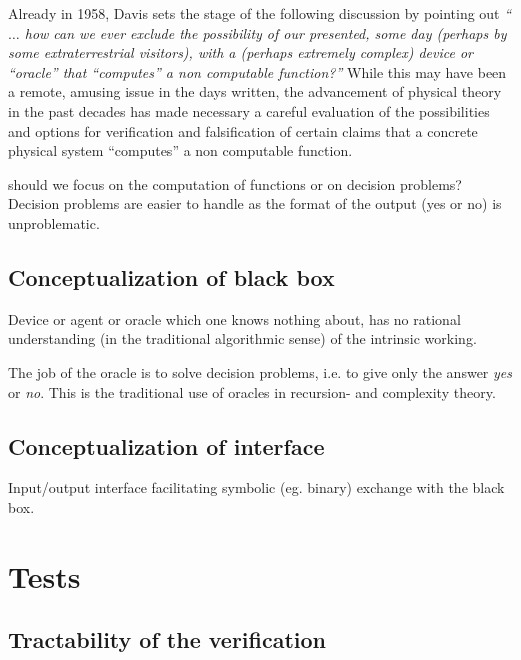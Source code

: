 Already in 1958, Davis \cite[p. 11]{davis-58}
sets the stage of the following discussion by pointing out
 {\em `` $\ldots$ how can we ever exclude the possibility of our
 presented,
 some day (perhaps by some extraterrestrial visitors), with a (perhaps
 extremely complex) device or ``oracle'' that ``computes'' a
 non computable function?''
 }
While this may have been a remote, amusing issue in the days written,
the advancement of physical theory in the past decades
has made necessary
a careful evaluation of the possibilities and options for
verification and falsification of certain claims that a concrete physical system
``computes''   a  non computable function.

\begin{Alex}
should we focus on the computation of functions or on decision
problems? Decision problems are easier to handle as the format of
the output (yes or no) is unproblematic.
\end{Alex}

\subsection{Conceptualization of black box}

Device or agent or oracle which one knows nothing about, has no
rational understanding (in the traditional algorithmic sense) of
the intrinsic working.

\begin{Alex}
The job of the oracle is to solve decision problems, i.e. to give
only the answer {\em yes} or {\em no}. This is the traditional use
of oracles in recursion- and complexity theory.
\end{Alex}

\subsection{Conceptualization of interface}

Input/output interface facilitating symbolic (eg. binary) exchange
with the black box.


\section{Tests}

\subsection{Tractability of the verification}

